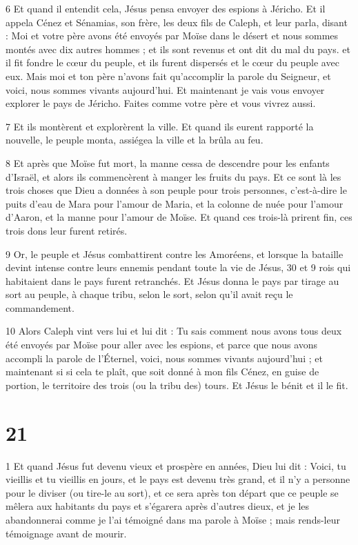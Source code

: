 \par 6 Et quand il entendit cela, Jésus pensa envoyer des espions à Jéricho. Et il appela Cénez et Sénamias, son frère, les deux fils de Caleph, et leur parla, disant : Moi et votre père avons été envoyés par Moïse dans le désert et nous sommes montés avec dix autres hommes ; et ils sont revenus et ont dit du mal du pays. et il fit fondre le cœur du peuple, et ils furent dispersés et le cœur du peuple avec eux. Mais moi et ton père n'avons fait qu'accomplir la parole du Seigneur, et voici, nous sommes vivants aujourd'hui. Et maintenant je vais vous envoyer explorer le pays de Jéricho. Faites comme votre père et vous vivrez aussi.

\par 7 Et ils montèrent et explorèrent la ville. Et quand ils eurent rapporté la nouvelle, le peuple monta, assiégea la ville et la brûla au feu.

\par 8 Et après que Moïse fut mort, la manne cessa de descendre pour les enfants d'Israël, et alors ils commencèrent à manger les fruits du pays. Et ce sont là les trois choses que Dieu a données à son peuple pour trois personnes, c'est-à-dire le puits d'eau de Mara pour l'amour de Maria, et la colonne de nuée pour l'amour d'Aaron, et la manne pour l'amour de Moïse. Et quand ces trois-là prirent fin, ces trois dons leur furent retirés.

\par 9 Or, le peuple et Jésus combattirent contre les Amoréens, et lorsque la bataille devint intense contre leurs ennemis pendant toute la vie de Jésus, 30 et 9 rois qui habitaient dans le pays furent retranchés. Et Jésus donna le pays par tirage au sort au peuple, à chaque tribu, selon le sort, selon qu'il avait reçu le commandement.

\par 10 Alors Caleph vint vers lui et lui dit : Tu sais comment nous avons tous deux été envoyés par Moïse pour aller avec les espions, et parce que nous avons accompli la parole de l'Éternel, voici, nous sommes vivants aujourd'hui ; et maintenant si si cela te plaît, que soit donné à mon fils Cénez, en guise de portion, le territoire des trois (ou la tribu des) tours. Et Jésus le bénit et il le fit.

\chapter{21}

\par 1 Et quand Jésus fut devenu vieux et prospère en années, Dieu lui dit : Voici, tu vieillis et tu vieillis en jours, et le pays est devenu très grand, et il n'y a personne pour le diviser (ou tire-le au sort), et ce sera après ton départ que ce peuple se mêlera aux habitants du pays et s'égarera après d'autres dieux, et je les abandonnerai comme je l'ai témoigné dans ma parole à Moïse ; mais rends-leur témoignage avant de mourir.

